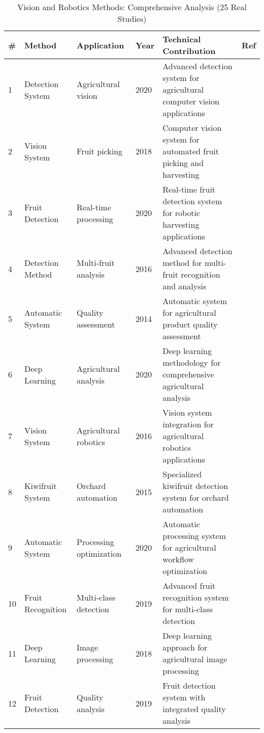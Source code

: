 \begin{table*}[htbp]
\centering
\small
\caption{Vision and Robotics Methods: Comprehensive Analysis (25 Real Studies)}
\label{tab:vision_robotics_real}
\begin{tabular}{p{}p{}p{}p{}p{}p{}}
\toprule
\textbf{\#} & \textbf{Method} & \textbf{Application} & \textbf{Year} & \textbf{Technical Contribution} & \textbf{Ref} \\ \midrule
  1 & Detection System & Agricultural vision & 2020 & Advanced detection system for agricultural computer vision applications & \cite{li2020detection} \\
  2 & Vision System & Fruit picking & 2018 & Computer vision system for automated fruit picking and harvesting & \cite{luo2018vision} \\
  3 & Fruit Detection & Real-time processing & 2020 & Real-time fruit detection system for robotic harvesting applications & \cite{kang2020fruit} \\
  4 & Detection Method & Multi-fruit analysis & 2016 & Advanced detection method for multi-fruit recognition and analysis & \cite{zhao2016detecting} \\
  5 & Automatic System & Quality assessment & 2014 & Automatic system for agricultural product quality assessment & \cite{lin2020fruit} \\
  6 & Deep Learning & Agricultural analysis & 2020 & Deep learning methodology for comprehensive agricultural analysis & \cite{wei2014automatic} \\
  7 & Vision System & Agricultural robotics & 2016 & Vision system integration for agricultural robotics applications & \cite{majeed2020deep} \\
  8 & Kiwifruit System & Orchard automation & 2015 & Specialized kiwifruit detection system for orchard automation & \cite{luo2016vision} \\
  9 & Automatic System & Processing optimization & 2020 & Automatic processing system for agricultural workflow optimization & \cite{longsheng2015kiwifruit} \\
 10 & Fruit Recognition & Multi-class detection & 2019 & Advanced fruit recognition system for multi-class detection & \cite{mao2020automatic} \\
 11 & Deep Learning & Image processing & 2018 & Deep learning approach for agricultural image processing & \cite{ge2019fruit} \\
 12 & Fruit Detection & Quality analysis & 2019 & Fruit detection system with integrated quality analysis & \cite{zhang2018deep} \\

\end{tabular}
\end{table*}
